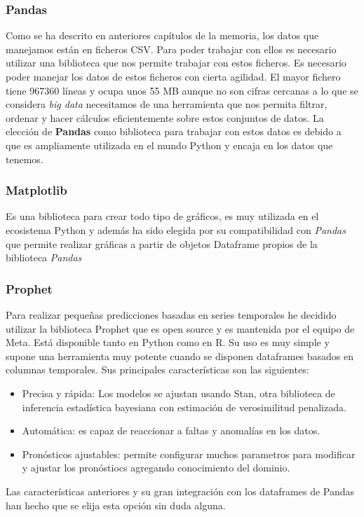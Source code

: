 \subsubsection{Pandas}
Como se ha descrito en anteriores capítulos de la memoria, los datos que manejamos están en ficheros CSV. Para poder trabajar con ellos es necesario utilizar una biblioteca que nos permite trabajar con estos ficheros. Es necesario poder manejar los datos de estos ficheros con cierta agilidad. El mayor fichero tiene 967360 líneas y ocupa unos 55 MB aunque no son cifras cercanas a lo que se considera \textit{big data} necesitamos de una herramienta que nos permita filtrar, ordenar y hacer cálculos eficientemente sobre estos conjuntos de datos. La elección de \textbf{Pandas} como biblioteca para trabajar con estos datos es debido a que es ampliamente utilizada en el mundo Python y encaja en los datos que tenemos.

\subsubsection{Matplotlib}
Es una biblioteca para crear todo tipo de gráficos, es muy utilizada en el ecosistema Python y además ha sido elegida por su compatibilidad con \textit{Pandas} que permite realizar gráficas a partir de objetos Dataframe propios de la biblioteca \textit{Pandas}

\subsubsection{Prophet}
Para realizar pequeñas predicciones basadas en series temporales he decidido utilizar la biblioteca Prophet que es open source y es mantenida por el equipo de Meta. Está disponible tanto en Python como en R. Su uso es muy simple y supone una herramienta muy potente cuando se disponen dataframes basados en columnas temporales. Sus principales características son las siguientes:
\begin{itemize}
\item Precisa y rápida: Los modelos se ajustan usando Stan, otra biblioteca de inferencia estadística bayesiana con estimación de verosimilitud penalizada.

\item Automática: es capaz de reaccionar a faltas y anomalías en los datos.

\item Pronósticos ajustables: permite configurar muchos parametros para modificar y ajustar los pronóstiocs agregando conocimiento del dominio.
\end{itemize}

Las características anteriores y su gran integración con los dataframes de Pandas han hecho que se elija esta opción sin duda alguna.
